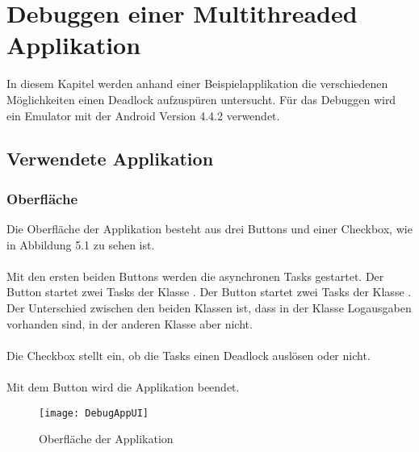 \chapter[Debuggen einer Multithreaded Applikation] {Debuggen einer Multithreaded Applikation}       
\label{cha:debugging}

In diesem Kapitel werden anhand einer Beispielapplikation die verschiedenen Möglichkeiten einen Deadlock aufzuspüren untersucht. Für das Debuggen wird ein Emulator mit der Android Version 4.4.2 verwendet.

\section{Verwendete Applikation}
\subsection{Oberfläche}
Die Oberfläche der Applikation besteht aus drei Buttons und einer Checkbox, wie in Abbildung 5.1 zu sehen ist. 
\\
\\
Mit den ersten beiden Buttons werden die asynchronen Tasks gestartet. Der Button  startet zwei Tasks der Klasse . Der Button  startet zwei Tasks der Klasse . Der Unterschied zwischen den beiden Klassen ist, dass in der  Klasse Logausgaben vorhanden sind, in der anderen Klasse aber nicht.
\\
\\
Die Checkbox  stellt ein, ob die Tasks einen Deadlock auslösen oder nicht.
\\
\\
Mit dem Button  wird die Applikation beendet.

\begin{figure}
\centering
\texttt{[image: DebugAppUI]}
\caption{Oberfläche der Applikation}
\label{fig:DebugAppUI}
\end{figure}

